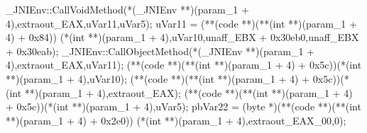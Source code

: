 \documentclass[
]{article}
\newenvironment{Shaded}{}{}
\newcommand{\BaseNTok}[1]{\textcolor[rgb]{0.25,0.63,0.44}{#1}}
\newcommand{\DataTypeTok}[1]{\textcolor[rgb]{0.56,0.13,0.00}{#1}}
\newcommand{\DecValTok}[1]{\textcolor[rgb]{0.25,0.63,0.44}{#1}}
\newcommand{\NormalTok}[1]{#1}
\newcommand{\OperatorTok}[1]{\textcolor[rgb]{0.40,0.40,0.40}{#1}}
\begin{document}
\begin{Shaded}
\begin{Highlighting}[]
\NormalTok{  \_JNIEnv}\OperatorTok{::}\NormalTok{CallVoidMethod}\OperatorTok{(*(}\NormalTok{\_JNIEnv }\OperatorTok{**)(}\NormalTok{param\_1 }\OperatorTok{+} \DecValTok{4}\OperatorTok{),}\NormalTok{extraout\_EAX}\OperatorTok{,}\NormalTok{uVar11}\OperatorTok{,}\NormalTok{uVar5}\OperatorTok{);}
\NormalTok{  uVar11 }\OperatorTok{=} \OperatorTok{(**(}\NormalTok{code }\OperatorTok{**)(**(}\DataTypeTok{int} \OperatorTok{**)(}\NormalTok{param\_1 }\OperatorTok{+} \DecValTok{4}\OperatorTok{)} \OperatorTok{+} \BaseNTok{0x84}\OperatorTok{))}
                     \OperatorTok{(*(}\DataTypeTok{int} \OperatorTok{**)(}\NormalTok{param\_1 }\OperatorTok{+} \DecValTok{4}\OperatorTok{),}\NormalTok{uVar10}\OperatorTok{,}\NormalTok{unaff\_EBX }\OperatorTok{+} \BaseNTok{0x30eb0}\OperatorTok{,}\NormalTok{unaff\_EBX }\OperatorTok{+} \BaseNTok{0x30eab}\OperatorTok{);}
\NormalTok{  \_JNIEnv}\OperatorTok{::}\NormalTok{CallObjectMethod}\OperatorTok{(*(}\NormalTok{\_JNIEnv }\OperatorTok{**)(}\NormalTok{param\_1 }\OperatorTok{+} \DecValTok{4}\OperatorTok{),}\NormalTok{extraout\_EAX}\OperatorTok{,}\NormalTok{uVar11}\OperatorTok{);}
  \OperatorTok{(**(}\NormalTok{code }\OperatorTok{**)(**(}\DataTypeTok{int} \OperatorTok{**)(}\NormalTok{param\_1 }\OperatorTok{+} \DecValTok{4}\OperatorTok{)} \OperatorTok{+} \BaseNTok{0x5c}\OperatorTok{))(*(}\DataTypeTok{int} \OperatorTok{**)(}\NormalTok{param\_1 }\OperatorTok{+} \DecValTok{4}\OperatorTok{),}\NormalTok{uVar10}\OperatorTok{);}
  \OperatorTok{(**(}\NormalTok{code }\OperatorTok{**)(**(}\DataTypeTok{int} \OperatorTok{**)(}\NormalTok{param\_1 }\OperatorTok{+} \DecValTok{4}\OperatorTok{)} \OperatorTok{+} \BaseNTok{0x5c}\OperatorTok{))(*(}\DataTypeTok{int} \OperatorTok{**)(}\NormalTok{param\_1 }\OperatorTok{+} \DecValTok{4}\OperatorTok{),}\NormalTok{extraout\_EAX}\OperatorTok{);}
  \OperatorTok{(**(}\NormalTok{code }\OperatorTok{**)(**(}\DataTypeTok{int} \OperatorTok{**)(}\NormalTok{param\_1 }\OperatorTok{+} \DecValTok{4}\OperatorTok{)} \OperatorTok{+} \BaseNTok{0x5c}\OperatorTok{))(*(}\DataTypeTok{int} \OperatorTok{**)(}\NormalTok{param\_1 }\OperatorTok{+} \DecValTok{4}\OperatorTok{),}\NormalTok{uVar5}\OperatorTok{);}
\NormalTok{  pbVar22 }\OperatorTok{=} \OperatorTok{(}\NormalTok{byte }\OperatorTok{*)(**(}\NormalTok{code }\OperatorTok{**)(**(}\DataTypeTok{int} \OperatorTok{**)(}\NormalTok{param\_1 }\OperatorTok{+} \DecValTok{4}\OperatorTok{)} \OperatorTok{+} \BaseNTok{0x2e0}\OperatorTok{))}
                              \OperatorTok{(*(}\DataTypeTok{int} \OperatorTok{**)(}\NormalTok{param\_1 }\OperatorTok{+} \DecValTok{4}\OperatorTok{),}\NormalTok{extraout\_EAX\_00}\OperatorTok{,}\DecValTok{0}\OperatorTok{);}

\end{Highlighting}
\end{Shaded}
\end{document}
